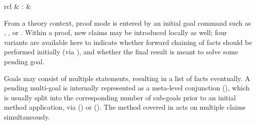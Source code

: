 \begin{isabellebody}
\begin{isamarkuptext}
\begin{matharray}{rcl}
    \hypertarget{command.print-statement}{\hyperlink{command.print-statement}{\mbox{}}} & : &  \\
  \end{matharray}

  From a theory context, proof mode is entered by an initial goal
  command such as \hyperlink{command.lemma}{\mbox{}}, \hyperlink{command.theorem}{\mbox{}}, or
  \hyperlink{command.corollary}{\mbox{}}.  Within a proof, new claims may be
  introduced locally as well; four variants are available here to
  indicate whether forward chaining of facts should be performed
  initially (via \hyperlink{command.then}{\mbox{}}), and whether the final result
  is meant to solve some pending goal.

  Goals may consist of multiple statements, resulting in a list of
  facts eventually.  A pending multi-goal is internally represented as
  a meta-level conjunction (), which is usually
  split into the corresponding number of sub-goals prior to an initial
  method application, via \hyperlink{command.proof}{\mbox{}}
  () or \hyperlink{command.apply}{\mbox{}}
  ().  The \hyperlink{method.induct}{\mbox{}} method
  covered in  acts on multiple claims
  simultaneously.


\end{isamarkuptext}
\end{isabellebody}
